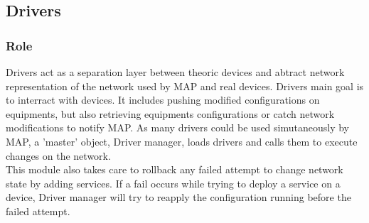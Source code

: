 \subsection{Drivers}
\subsubsection{Role}
Drivers act as a separation layer between theoric devices and abtract network representation of the network used by MAP and real devices. Drivers main goal is to interract with devices. It includes pushing modified configurations on equipments, but also retrieving equipments configurations or catch network modifications to notify MAP. As many drivers could be used simutaneously by MAP, a 'master' object, Driver manager, loads drivers and calls them to execute changes on the network.\\
This module also takes care to rollback any failed attempt to change network state by adding services. If a fail occurs while trying to deploy a service on a device, Driver manager will try to reapply the configuration running before the failed attempt.

